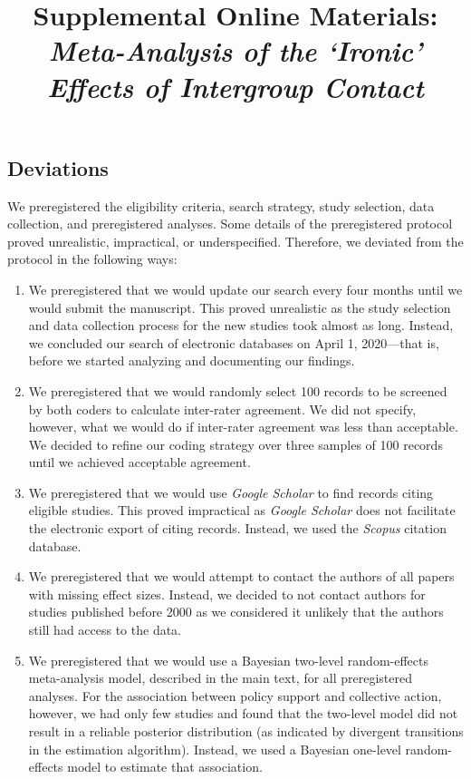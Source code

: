 \documentclass[12pt, letterpaper]{article}
\title{ Supplemental Online Materials:\\\textit{Meta-Analysis of the `Ironic' Effects of Intergroup Contact} }
\author{  }
\begin{document}
\maketitle

\hypertarget{deviations}{%
\subsection{Deviations}\label{deviations}}

We preregistered the eligibility criteria, search strategy, study
selection, data collection, and preregistered analyses. Some details of
the preregistered protocol proved unrealistic, impractical, or
underspecified. Therefore, we deviated from the protocol in the
following ways:

\begin{enumerate}
\def\labelenumi{\arabic{enumi}.}
\item
  We preregistered that we would update our search every four months
  until we would submit the manuscript. This proved unrealistic as the
  study selection and data collection process for the new studies took
  almost as long. Instead, we concluded our search of electronic
  databases on April 1, 2020---that is, before we started analyzing and
  documenting our findings.
\item
  We preregistered that we would randomly select 100 records to be
  screened by both coders to calculate inter-rater agreement. We did not
  specify, however, what we would do if inter-rater agreement was less
  than acceptable. We decided to refine our coding strategy over three
  samples of 100 records until we achieved acceptable agreement.
\item
  We preregistered that we would use \emph{Google Scholar} to find
  records citing eligible studies. This proved impractical as
  \emph{Google Scholar} does not facilitate the electronic export of
  citing records. Instead, we used the \emph{Scopus} citation database.
\item
  We preregistered that we would attempt to contact the authors of all
  papers with missing effect sizes. Instead, we decided to not contact
  authors for studies published before 2000 as we considered it unlikely
  that the authors still had access to the data.
\item
  We preregistered that we would use a Bayesian two-level random-effects
  meta-analysis model, described in the main text, for all preregistered
  analyses. For the association between policy support and collective
  action, however, we had only few studies and found that the two-level
  model did not result in a reliable posterior distribution (as
  indicated by divergent transitions in the estimation algorithm).
  Instead, we used a Bayesian one-level random-effects model to estimate
  that association.
\end{enumerate}
\end{document}
